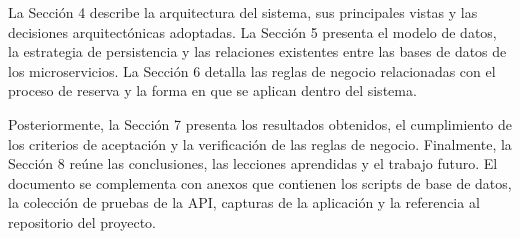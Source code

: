 La Sección 4 describe la arquitectura del sistema, sus principales vistas y las
decisiones arquitectónicas adoptadas. La Sección 5 presenta el modelo de datos,
la estrategia de persistencia y las relaciones existentes entre las bases de
datos de los microservicios. La Sección 6 detalla las reglas de negocio
relacionadas con el proceso de reserva y la forma en que se aplican dentro del
sistema.

Posteriormente, la Sección 7 presenta los resultados obtenidos, el cumplimiento
de los criterios de aceptación y la verificación de las reglas de negocio.
Finalmente, la Sección 8 reúne las conclusiones, las lecciones aprendidas y el
trabajo futuro. El documento se complementa con anexos que contienen los scripts
de base de datos, la colección de pruebas de la API, capturas de la aplicación
y la referencia al repositorio del proyecto.
